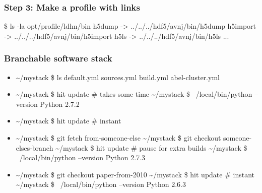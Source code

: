 \documentclass[sans,mathserif]{beamer}
\begin{document}
\begin{frame}[fragile]
\frametitle{Step 3: Make a profile with links}
\begin{semiverbatim}
\$ ls -la opt/profile/ldhn/bin
h5dump -> ../../../hdf5/avnj/bin/h5dump
h5import -> ../../../hdf5/avnj/bin/h5import
h5ls -> ../../../hdf5/avnj/bin/h5ls
...
\end{semiverbatim}
\end{frame}


\begin{frame}[fragile]
\frametitle{Branchable software stack}

\begin{itemize}
\item<+->
\begin{semiverbatim}
\textasciitilde{}/mystack \$ ls
default.yml sources.yml build.yml abel-cluster.yml
\end{semiverbatim}

\item<+->
\begin{semiverbatim}
\textasciitilde{}/mystack \$ hit update # takes some time
\textasciitilde{}/mystack \$ ~/local/bin/python --version
Python 2.7.2
\end{semiverbatim}
\item<+->
\begin{semiverbatim}
\textasciitilde{}/mystack \$ hit update # instant
\end{semiverbatim}

\item<+->
\begin{semiverbatim}
\textasciitilde{}/mystack \$ git fetch from-someone-else
\textasciitilde{}/mystack \$ git checkout someone-elses-branch
\textasciitilde{}/mystack \$ hit update # pause for extra builds
\textasciitilde{}/mystack \$ ~/local/bin/python --version
Python 2.7.3
\end{semiverbatim}

\item<+->
\begin{semiverbatim}
\textasciitilde{}/mystack \$ git checkout paper-from-2010
\textasciitilde{}/mystack \$ hit update # instant
\textasciitilde{}/mystack \$ ~/local/bin/python --version
Python 2.6.3
\end{semiverbatim}
\end{itemize}
\end{frame}
\end{document}
